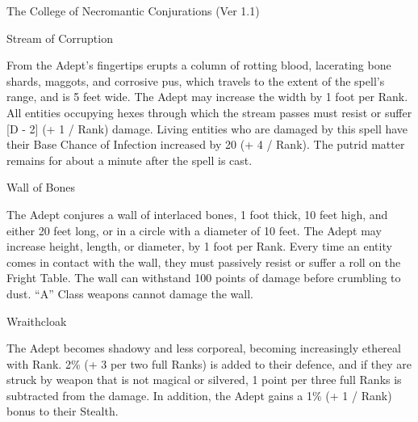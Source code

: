 \begin{Chapter}{The College of Necromantic Conjurations (Ver 1.1)}
\begin{spell}[S-14]{Stream of Corruption}

\begin{effects}
From the Adept’s fingertips erupts a column of rotting blood,
lacerating bone shards, maggots, and corrosive pus, which travels to
the extent of the spell’s range, and is 5 feet wide. The Adept may
increase the width by 1 foot per Rank.  All entities occupying hexes
through which the stream passes must resist or suffer [D - 2] (+ 1 /
Rank) damage.  Living entities who are damaged by this spell have
their Base Chance of Infection increased by 20 (+ 4 / Rank).  The
putrid matter remains for about a minute after the spell is cast.
\end{effects}
\end{spell}

\begin{spell}[S-15]{Wall of Bones}

\begin{effects}
The Adept conjures a wall of interlaced bones, 1 foot thick, 10 feet
high, and either 20 feet long, or in a circle with a diameter of 10
feet. The Adept may increase height, length, or diameter, by 1 foot
per Rank.  Every time an entity comes in contact with the wall, they
must passively resist or suffer a roll on the Fright Table.  The wall
can withstand 100 points of damage before crumbling to dust.  “A”
Class weapons cannot damage the wall.
\end{effects}
\end{spell}

\begin{spell}[S-16]{Wraithcloak}
\begin{effects}
The Adept becomes shadowy and less corporeal, becoming increasingly
ethereal with Rank. 2\% (+ 3 per two full Ranks) is added to their
defence, and if they are struck by weapon that is not magical or
silvered, 1 point per three full Ranks is subtracted from the damage.
In addition, the Adept gains a 1\% (+ 1 / Rank) bonus to their
Stealth.
\end{effects}
\end{spell}


\end{Chapter}
